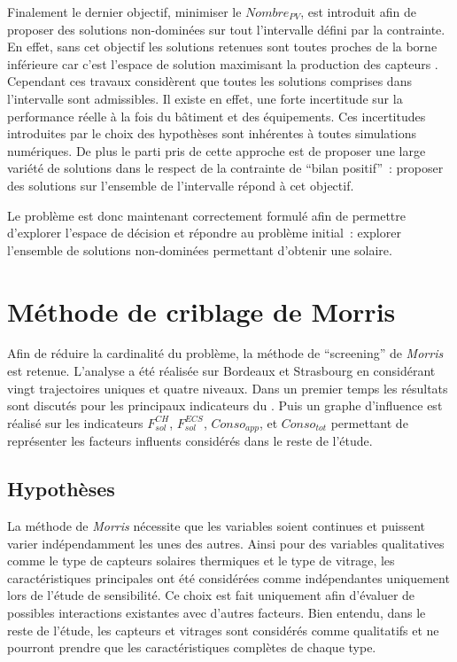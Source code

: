 Finalement le dernier objectif, minimiser le $Nombre_{PV}$, est introduit afin de proposer
des solutions non-dominées sur tout l’intervalle défini par la contrainte. En effet,
sans cet objectif les solutions retenues sont toutes proches de la borne inférieure car
c’est l’espace de solution maximisant la production des capteurs . Cependant ces
travaux considèrent que toutes les solutions comprises dans l’intervalle sont admissibles.
Il existe en effet, une forte incertitude sur la performance réelle à la fois du bâtiment
et des équipements. Ces incertitudes introduites par le choix des hypothèses sont
inhérentes à toutes simulations numériques. De plus le parti pris de cette approche est de
proposer une large variété de solutions dans le respect de la contrainte de \enquote{bilan
positif}~: proposer des solutions sur l’ensemble de l’intervalle répond à cet objectif.

Le problème est donc maintenant correctement formulé afin de permettre d’explorer l’espace
de décision et répondre au problème initial~: explorer l’ensemble de solutions non-dominées
permettant d’obtenir une  solaire.



\section{Méthode de criblage de Morris} %
\label{sec:methode_criblage_de_morris}
Afin de réduire la cardinalité du problème, la méthode de \enquote{screening} de
\textit{Morris} est retenue. L’analyse a été réalisée sur Bordeaux et Strasbourg en
considérant vingt trajectoires uniques et quatre niveaux. Dans un premier temps les
résultats sont discutés pour les principaux indicateurs du . Puis un graphe
d’influence est réalisé sur les indicateurs $F_{sol}^{CH}$, $F_{sol}^{ECS}$,
$Conso_{app}$, et $Conso_{tot}$ permettant de représenter les facteurs influents
considérés dans le reste de l’étude.

\subsection{Hypothèses} %
\label{sub:hypotheses_morris}
La méthode de \textit{Morris} nécessite que les variables soient continues et
puissent varier indépendamment les unes des autres. Ainsi pour des variables qualitatives
comme le type de capteurs solaires thermiques et le type de vitrage, les caractéristiques
principales ont été considérées comme indépendantes uniquement lors de l’étude de
sensibilité. Ce choix est fait uniquement afin d’évaluer de possibles interactions existantes avec d’autres facteurs.
Bien entendu, dans le reste de l’étude, les capteurs et vitrages sont considérés comme
qualitatifs et ne pourront prendre que les caractéristiques complètes de chaque type.

